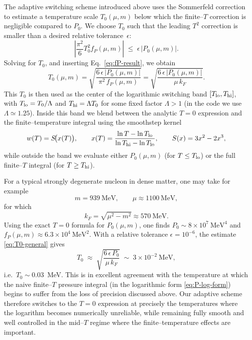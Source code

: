 \documentclass[superscriptaddress,amsmath,floatfix,aps,prc,twocolumn]{revtex4-1}
\begin{document}
The adaptive switching scheme introduced above uses the Sommerfeld
correction to estimate a temperature scale $T_0(\mu,m)$ below which the
finite--$T$ correction is negligible compared to $P_0$.
We choose $T_0$ such that the leading $T^2$ correction is smaller than a
desired relative tolerance~$\epsilon$:
\begin{equation}
\left|
  \frac{\pi^2}{6}T_0^2 f_P(\mu,m)
\right|
\;\le\;
\epsilon\, |P_0(\mu,m)| .
\end{equation}
Solving for $T_0$, and inserting Eq.~\eqref{eq:fP-result}, we obtain
\begin{equation}
T_0(\mu,m)
=
\sqrt{
\frac{6\,\epsilon\,|P_0(\mu,m)|}{\pi^2\,f_P(\mu,m)}
}
=
\sqrt{
\frac{6\,\epsilon\,|P_0(\mu,m)|}{\mu\,k_F}
}.
\label{eq:T0-general}
\end{equation}
This $T_0$ is then used as the center of the logarithmic switching band
$[T_{\rm lo},T_{\rm hi}]$, with
$T_{\rm lo} = T_0/\Lambda$ and $T_{\rm hi} = \Lambda T_0$ for some fixed
factor $\Lambda>1$ (in the code we use $\Lambda\simeq 1.25$).
Inside this band we blend between the analytic $T=0$ expression and the
finite--temperature integral using the smoothstep kernel
\[
w(T) = S\!\bigl(x(T)\bigr),
\qquad
x(T) =
\frac{\ln T - \ln T_{\rm lo}}
     {\ln T_{\rm hi}-\ln T_{\rm lo}},
\qquad
S(x)=3x^2-2x^3,
\]
while outside the band we evaluate either $P_0(\mu,m)$ (for
$T\le T_{\rm lo}$) or the full finite--$T$ integral (for $T\ge T_{\rm hi}$).

For a typical strongly degenerate nucleon in dense matter, one may take
for example
\[
m = 939~\mathrm{MeV},\qquad
\mu \approx 1100~\mathrm{MeV},
\]
for which
\[
k_F = \sqrt{\mu^2 - m^2} \approx 570~\mathrm{MeV}.
\]
Using the exact $T=0$ formula for $P_0(\mu,m)$, one finds
$P_0 \sim 8\times 10^7~\mathrm{MeV}^4$ and
$f_P(\mu,m) \approx 6.3\times 10^4~\mathrm{MeV}^2$.
With a relative tolerance $\epsilon = 10^{-6}$, the estimate
\eqref{eq:T0-general} gives
\[
T_0 \;\approx\;
\sqrt{
\frac{6\,\epsilon\,P_0}{\mu\,k_F}
}
\;\sim\;
3\times 10^{-2}~\mathrm{MeV},
\]
i.e.\ $T_0 \sim 0.03$~MeV.
This is in excellent agreement with the temperature at which the naive
finite--$T$ pressure integral (in the logarithmic form
\eqref{eq:P-log-form}) begins to suffer from the loss of precision
discussed above.
Our adaptive scheme therefore switches to the $T=0$ expression at
precisely the temperatures where the logarithm becomes numerically
unreliable, while remaining fully smooth and well controlled in the
mid--$T$ regime where the finite--temperature effects are important.
\end{document}
